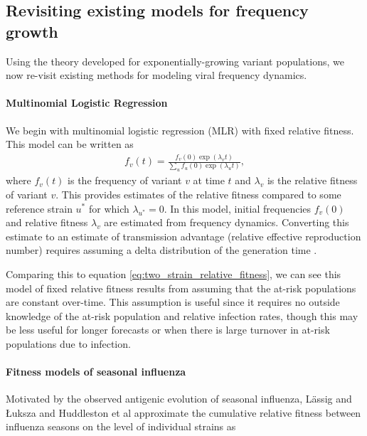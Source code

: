 \documentclass[11pt,oneside,letterpaper]{article}
\begin{document}
\subsection{Revisiting existing models for frequency growth}\label{ssec:existing_frequency_models}

Using the theory developed for exponentially-growing variant populations, we now re-visit existing methods for modeling viral frequency dynamics.

\paragraph{Multinomial Logistic Regression}%

We begin with multinomial logistic regression (MLR) with fixed relative fitness.
This model can be written as
\begin{align}
    f_{v}(t) = \frac{f_{v}(0) \exp(\lambda_{v} t)}{\sum_{u} f_{u}(0) \exp(\lambda_{u} t)},
\end{align}
where $f_{v}(t)$ is the frequency of variant $v$ at time $t$ and $\lambda_{v}$ is the relative fitness of variant $v$.
This provides estimates of the relative fitness compared to some reference strain $u^{*}$ for which $\lambda_{u^*} = 0$.
In this model, initial frequencies $f_{v}(0)$ and relative fitness $\lambda_{v}$ are estimated from frequency dynamics.
Converting this estimate to an estimate of transmission advantage (relative effective reproduction number) requires assuming a delta distribution of the generation time \cite{Wallinga2006}.

Comparing this to equation \ref{eq:two_strain_relative_fitness}, we can see this model of fixed relative fitness results from assuming that the at-risk populations are constant over-time.
This assumption is useful since it requires no outside knowledge of the at-risk population and relative infection rates, though this may be less useful for longer forecasts or when there is large turnover in at-risk populations due to infection.

\paragraph{Fitness models of seasonal influenza}%

Motivated by the observed antigenic evolution of seasonal influenza, L{\"a}ssig and {\L}uksza \cite{luksza2014predictive} and Huddleston et al \cite{Huddleston2020} approximate the cumulative relative fitness between influenza seasons on the level of individual strains as
\end{document}

